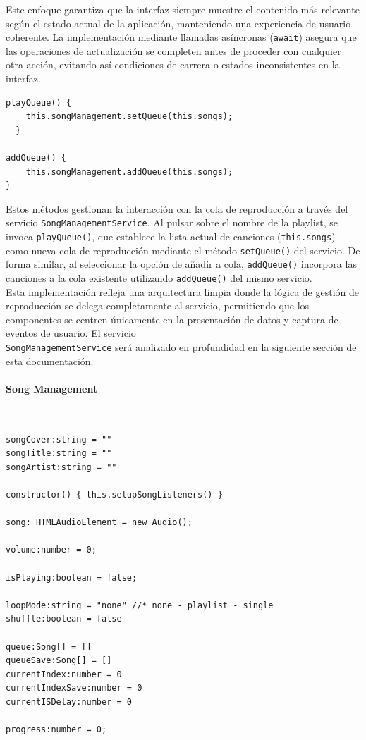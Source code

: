 \documentclass[11pt, a4paper]{article}
\begin{document}
                Este enfoque garantiza que la interfaz siempre muestre el contenido más relevante según el estado actual de la aplicación, manteniendo una experiencia de usuario coherente. La implementación mediante llamadas asíncronas (\texttt{await}) asegura que las operaciones de actualización se completen antes de proceder con cualquier otra acción, evitando así condiciones de carrera o estados inconsistentes en la interfaz.

                \begin{lstlisting}[caption={playQueue() y addQueue()}]
playQueue() {
    this.songManagement.setQueue(this.songs);
  }

addQueue() {
    this.songManagement.addQueue(this.songs);
}
                \end{lstlisting}

                Estos métodos gestionan la interacción con la cola de reproducción a través del servicio \texttt{SongManagementService}. Al pulsar sobre el nombre de la playlist, se invoca \texttt{playQueue()}, que establece la lista actual de canciones (\texttt{this.songs}) como nueva cola de reproducción mediante el método \texttt{setQueue()} del servicio. De forma similar, al seleccionar la opción de añadir a cola, \texttt{addQueue()} incorpora las canciones a la cola existente utilizando \texttt{addQueue()} del mismo servicio. \\

                Esta implementación refleja una arquitectura limpia donde la lógica de gestión de reproducción se delega completamente al servicio, permitiendo que los componentes se centren únicamente en la presentación de datos y captura de eventos de usuario. El servicio \\ \texttt{SongManagementService} será analizado en profundidad en la siguiente sección de esta documentación.

                \paragraph{Song Management}
                ‎

                \begin{lstlisting}[caption={Atributos Song Management}]
songCover:string = ""
songTitle:string = ""
songArtist:string = ""

constructor() { this.setupSongListeners() }

song: HTMLAudioElement = new Audio();

volume:number = 0;

isPlaying:boolean = false;

loopMode:string = "none" //* none - playlist - single
shuffle:boolean = false

queue:Song[] = []
queueSave:Song[] = []
currentIndex:number = 0
currentIndexSave:number = 0
currentISDelay:number = 0

progress:number = 0;
                \end{lstlisting}
\end{document}

